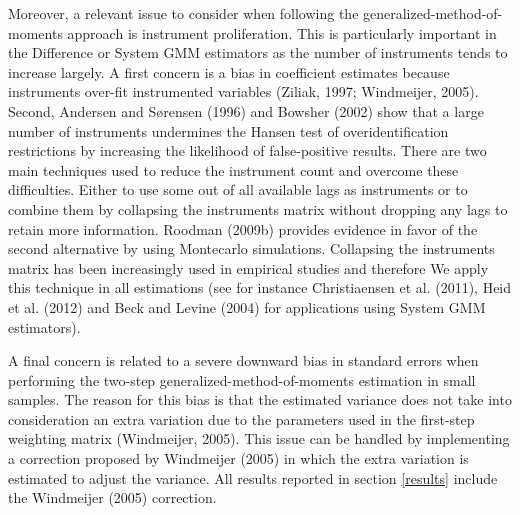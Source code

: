 \documentclass[11pt]{amsart}
\begin{document}
Moreover, a relevant issue to consider when following the generalized-method-of-moments approach is instrument proliferation. This is particularly important in the Difference or System GMM estimators as the number of instruments tends to increase largely. A first concern is a bias in coefficient estimates because instruments over-fit instrumented variables (Ziliak, 1997; Windmeijer, 2005). Second, Andersen and S\o rensen (1996) and Bowsher (2002) show that a large number of instruments undermines the Hansen test of overidentification restrictions by increasing the likelihood of false-positive results. There are two main techniques used to reduce the instrument count and overcome these difficulties. Either to use some out of all available lags as instruments or to combine them by collapsing the instruments matrix without dropping any lags to retain more information. Roodman (2009b) provides evidence in favor of the second alternative by using Montecarlo simulations. Collapsing the instruments matrix has been increasingly used in empirical studies and therefore We apply this technique in all estimations (see for instance Christiaensen et al. (2011), Heid et al. (2012) and Beck and Levine (2004) for applications using System GMM estimators).

A final concern is related to a severe downward bias in standard errors when performing the two-step generalized-method-of-moments estimation in small samples. The reason for this bias is that the estimated variance does not take into consideration an extra variation due to the parameters used in the first-step weighting matrix (Windmeijer, 2005). This issue can be handled by implementing a correction proposed by Windmeijer (2005) in which the extra variation is estimated to adjust the variance. All results reported in section \ref{results} include the Windmeijer (2005) correction.



\nocite{*}

%


\newpage
\end{document}
